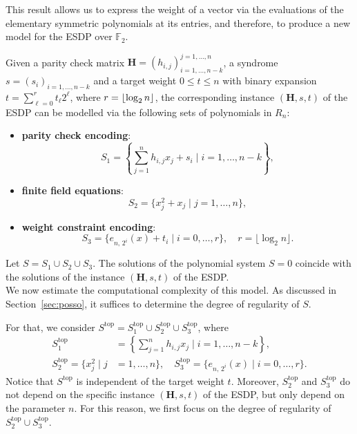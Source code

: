 \documentclass[11pt]{article}
\newcommand{\F}[0]{\mathbb{F}}
\newcommand{\es}[2]{e_{#1,\, #2}}
\DeclarePairedDelimiter{\fl}{\lfloor}{\rfloor}
\theoremstyle{plain}
\theoremstyle{definition}
\theoremstyle{remark}
\begin{document}
This result allows us to express the weight of a vector via the evaluations of the elementary symmetric polynomials at its entries, and therefore, to produce a new model for the ESDP over $\F_2$. 

Given a parity check matrix $\mathbf{H}=(h_{i,j})_{i=1,\dots,n-k}^{j=1,\dots,n}$, a syndrome $s=(s_i)_{i=1,\dots,n-k}$ and a target weight $0\leq t\leq n$ with binary expansion $t = \sum\limits_{\ell=0}^r t_\ell2^\ell$, where $r=\fl*{\operatorname{log}_2 n}$, the corresponding instance $(\mathbf{H},s,t)$ of the ESDP can be modelled via the following sets of polynomials in $R_n$:    
\begin{itemize}
    \item \textbf{parity check encoding}:
    \begin{equation*}
        S_1 = \left\{\sum_{j=1}^n h_{i,j}x_j + s_i\mid i=1,\dots,n-k\right\},
    \end{equation*}
    \item \textbf{finite field equations}:
    \begin{equation*}
        S_2 = \{x_j^2+x_j\mid j=1,\dots,n \},
    \end{equation*}
    \item \textbf{weight constraint encoding}:
    \begin{equation*}
        S_3 = \{\es{n}{2^i}(x)+t_i\mid i=0,\dots,r \},\quad r=\lfloor\operatorname{log}_2n\rfloor.
    \end{equation*}
\end{itemize}
Let $S=S_1\cup S_2\cup S_3$. The solutions of the polynomial system $S=0$ coincide with the solutions of the instance $(\mathbf{H},s,t)$ of the ESDP.\\

We now estimate the computational complexity of this model. As discussed in Section~\ref{sec:posso}, it suffices to determine the degree of regularity of $S$.

For that, we consider $S^{\operatorname{top}}=S_1^{\operatorname{top}}\cup S_2^{\operatorname{top}}\cup S_3^{\operatorname{top}}$, where 
\begin{align*}
    S_1^{\operatorname{top}} &= \left\{\sum_{j=1}^n h_{i,j}x_j\mid i=1,\dots,n-k\right\},\\
    S_2^{\operatorname{top}} = \{x_j^2\mid j&=1,\dots,n \},\quad S_3^{\operatorname{top}} = \{\es{n}{2^i}(x)\mid i=0,\dots,r\}.
\end{align*}
Notice that $S^{\operatorname{top}}$ is independent of the target weight $t$. Moreover, $S_2^{\operatorname{top}}$ and $S_3^{\operatorname{top}}$ do not depend on the specific instance $(\mathbf{H},s,t)$ of the ESDP, but only depend on the parameter $n$. For this reason, we first focus on the degree of regularity of $S_2^{\operatorname{top}}\cup S_3^{\operatorname{top}}$.
\end{document}
